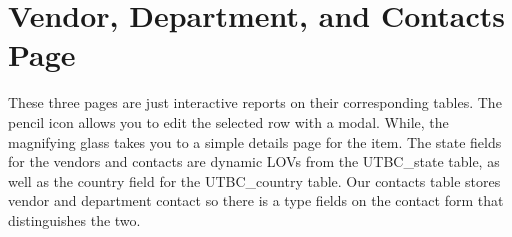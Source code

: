 \documentclass{report}
\begin{document}
\section{Vendor, Department, and Contacts Page}
These three pages are just interactive reports on their corresponding tables. The pencil icon allows you to edit the selected row with a modal. While, the magnifying glass takes you to a simple details page for the item. The state fields for the vendors and contacts are dynamic LOVs from the UTBC\_state table, as well as the country field for the UTBC\_country table. Our contacts table stores vendor and department contact so there is a type fields on the contact form that distinguishes the two.
\end{document}
